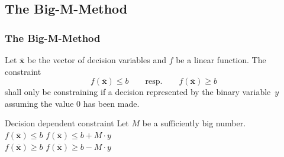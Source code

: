 \subsection{The Big-M-Method}
\begin{frame}
 \frametitle{The Big-M-Method}
 Let $\mathbf{\overline{x}}$ be the vector of decision variables and $f$ be a linear function. The constraint
  \[
  f(\mathbf{\overline{x}}) \leq b\qquad\text{resp.}\qquad f(\mathbf{\overline{x}}) \geq b
  \]
  shall only be constraining if a decision represented by the binary variable~$y$ assuming the value 0 has been made.

  \begin{block}{Decision dependent constraint}
  Let $M$ be a sufficiently big number.\\
  $f(\mathbf{\overline{x}}) \leq b$ \quad\textrightarrow{}\quad $f(\mathbf{\overline{x}}) \leq b + M\cdot y$\\
  $f(\mathbf{\overline{x}}) \geq b$ \quad\textrightarrow{}\quad $f(\mathbf{\overline{x}}) \geq b - M\cdot y$
\end{block}
\end{frame}

